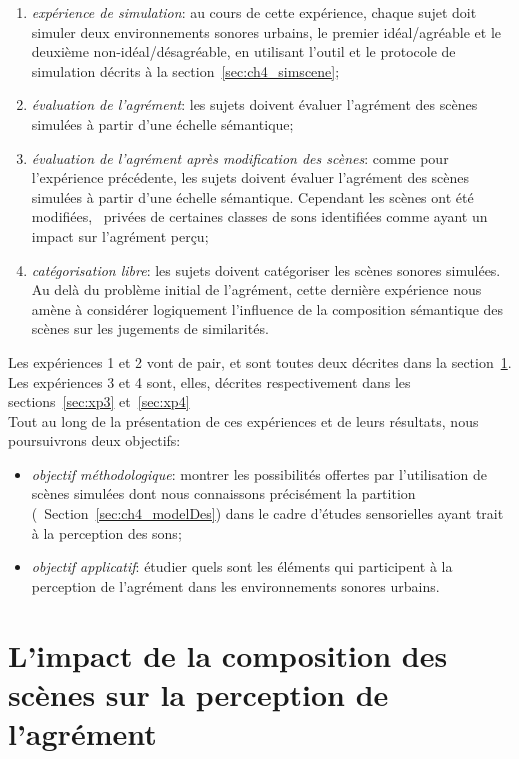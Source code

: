 \begin{enumerate}
\item \emph{expérience de simulation}: au cours de cette expérience, chaque sujet doit simuler deux environnements sonores urbains, le premier idéal/agréable et le deuxième non-idéal/désagréable, en utilisant l'outil et le protocole de simulation décrits à la section~\ref{sec:ch4_simscene};
\item \emph{évaluation de l'agrément}: les sujets doivent évaluer l'agrément des scènes simulées à partir d'une échelle sémantique;
\item \emph{évaluation de l'agrément après modification des scènes}: comme pour l'expérience précédente, les sujets doivent évaluer l'agrément des scènes simulées à partir d'une échelle sémantique. Cependant les scènes ont été modifiées, \ie~privées de certaines classes de sons identifiées comme ayant un impact sur l'agrément perçu; 
\item \emph{catégorisation libre}: les sujets doivent catégoriser les scènes sonores simulées. Au delà du problème initial de l'agrément, cette dernière expérience nous amène à considérer logiquement l'influence de la composition sémantique des scènes sur les jugements de similarités.
\end{enumerate}

Les expériences 1 et 2 vont de pair, et sont toutes deux décrites dans la section~\ref{sec:xp1_2}. Les expériences 3 et 4 sont, elles, décrites respectivement dans les sections~\ref{sec:xp3} et~\ref{sec:xp4}  \\

Tout au long de la présentation de ces expériences et de leurs résultats, nous poursuivrons deux objectifs:

\begin{itemize}
\item \emph{objectif méthodologique}: montrer les possibilités offertes par l'utilisation de scènes simulées dont nous connaissons précisément la partition (\cf~Section~\ref{sec:ch4_modelDes}) dans le cadre d'études sensorielles ayant trait à la perception des sons;
\item \emph{objectif applicatif}: étudier quels sont les éléments qui participent à la perception de l'agrément dans les environnements sonores urbains. 
\end{itemize}

\section{L'impact de la composition des scènes sur la perception de l'agrément}
\label{sec:xp1_2}

